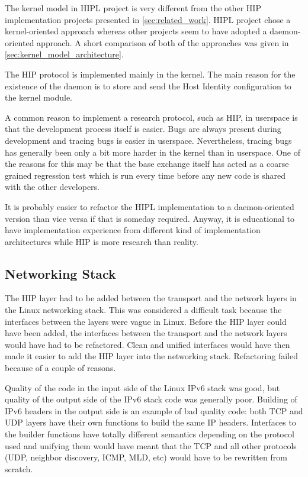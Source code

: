 The kernel model in HIPL project is very different from the other HIP
implementation projects presented in \autoref{sec:related_work}. HIPL
project chose a kernel-oriented approach whereas other projects seem
to have adopted a daemon-oriented approach. A short comparison of both
of the approaches was given in
\autoref{sec:kernel_model_architecture}.

The HIP protocol is implemented mainly in the kernel. The main reason
for the existence of the daemon is to store and send the Host Identity
configuration to the kernel module.

A common reason to implement a research protocol, such as HIP, in
userspace is that the development process itself is easier. Bugs are
always present during development and tracing bugs is easier in
userspace. Nevertheless, tracing bugs has generally been only a bit
more harder in the kernel than in userspace. One of the reasons for
this may be that the base exchange itself has acted as a coarse
grained regression test which is run every time before any new code is
shared with the other developers.

It is probably easier to refactor the HIPL implementation to a
daemon-oriented version than vice versa if that is someday
required. Anyway, it is educational to have implementation experience
from different kind of implementation architectures while HIP is more
research than reality.

\subsection{Networking Stack}
\label{sec:networking_stack_lessons}

The HIP layer had to be added between the transport and the network
layers in the Linux networking stack. This was considered a difficult
task because the interfaces between the layers were vague in
Linux. Before the HIP layer could have been added, the interfaces
between the transport and the network layers would have had to be
refactored. Clean and unified interfaces would have then made it
easier to add the HIP layer into the networking stack. Refactoring
failed because of a couple of reasons.

Quality of the code in the input side of the Linux IPv6 stack was
good, but quality of the output side of the IPv6 stack code was
generally poor. Building of IPv6 headers in the output side is an
example of bad quality code: both TCP and UDP layers have their own
functions to build the same IP headers. Interfaces to the builder
functions have totally different semantics depending on the protocol
used and unifying them would have meant that the TCP and all other
protocols (UDP, neighbor discovery, ICMP, MLD, etc) would have to be
rewritten from scratch.

